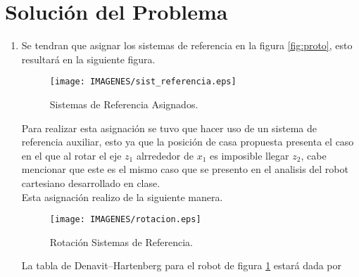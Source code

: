 \documentclass[12pt]{article}
\begin{document}
\section{Solución del Problema}
\begin{enumerate}
    \item Se tendran que asignar los sistemas de referencia en la figura \ref{fig:proto}, esto resultará en la siguiente figura.
    \begin{figure}[h]
        \centering
        \texttt{[image: IMAGENES/sist\_referencia.eps]}
        \caption{Sistemas de Referencia Asignados.}
        \label{fig:reference}
    \end{figure}

    Para realizar esta asignación se tuvo que hacer uso de un sistema de referencia auxiliar, esto ya que la posición de casa propuesta presenta el caso en el que al rotar el eje $z_1$ alrrededor de $x_1$ es imposible llegar $z_2$, cabe mencionar que este es el mismo caso que se presento en el analisis del robot cartesiano desarrollado en clase. 
    \\
    Esta asignación realizo de la siguiente manera.

    \begin{figure}[h]
        \centering
        \texttt{[image: IMAGENES/rotacion.eps]}
        \caption{Rotación Sistemas de Referencia.}
        \label{fig:rotaciones}
    \end{figure}

    La tabla de Denavit–Hartenberg para el robot de figura \ref{fig:reference} estará dada por


\end{enumerate}
\end{document}
